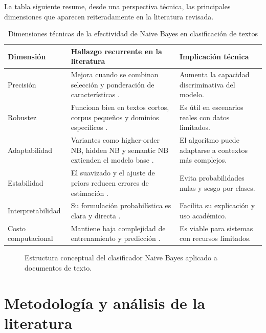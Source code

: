 La tabla siguiente resume, desde una perspectiva técnica, las principales dimensiones que aparecen reiteradamente en la literatura revisada.

\begin{table}[H]
\centering
\caption{Dimensiones técnicas de la efectividad de Naive Bayes en clasificación de textos}
\label{tab:dimensiones}
\small
\begin{tabularx}{\textwidth}{|L{3.1cm}|X|X|}
\hline
\textbf{Dimensión} & \textbf{Hallazgo recurrente en la literatura} & \textbf{Implicación técnica} \\ \hline
Precisión & Mejora cuando se combinan selección y ponderación de características \cite{Kim2006,Jiang2016,ZHANG2016137}. & Aumenta la capacidad discriminativa del modelo. \\ \hline
Robustez & Funciona bien en textos cortos, corpus pequeños y dominios específicos \cite{Sangounpao2019,Awotunde2023131,Pratmanto2020}. & Es útil en escenarios reales con datos limitados. \\ \hline
Adaptabilidad & Variantes como higher-order NB, hidden NB y semantic NB extienden el modelo base \cite{Ganiz20111022,Gan2021,KIM2018128}. & El algoritmo puede adaptarse a contextos más complejos. \\ \hline
Estabilidad & El suavizado y el ajuste de priors reducen errores de estimación \cite{Frank2006,10.1007/978-3-540-71496-5_73}. & Evita probabilidades nulas y sesgo por clases. \\ \hline
Interpretabilidad & Su formulación probabilística es clara y directa \cite{Kim2006,Frank2006}. & Facilita su explicación y uso académico. \\ \hline
Costo computacional & Mantiene baja complejidad de entrenamiento y predicción \cite{Jiang2016,CHEN20095432}. & Es viable para sistemas con recursos limitados. \\ \hline
\end{tabularx}
\end{table}

\begin{figure}[H]
\centering
{}
\caption{Estructura conceptual del clasificador Naive Bayes aplicado a documentos de texto.}
\label{fig:estructura_nb}
\end{figure}

\section{Metodología y análisis de la literatura}


